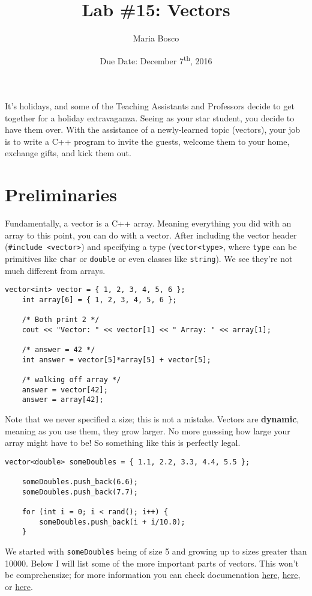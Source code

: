 \documentclass[12pt]{article}
\title{Lab \#15: Vectors}
\date{Due Date: December 7\textsuperscript{th}, 2016}
\author{Maria Bosco}
\newcommand{\shellcmd}[1]{\texttt{\colorbox{gray!30}{#1}}}
\begin{document}
\maketitle

It's holidays, and some of the Teaching Assistants and Professors decide to get together for a holiday extravaganza. Seeing as your star student, you decide to have them over. With the assistance of a newly-learned topic (vectors), your job is to write a C++ program to invite the guests, welcome them to your home, exchange gifts, and kick them out.

\section{Preliminaries}
Fundamentally, a vector is a C++ array. Meaning everything you did with an array to this point, you can do with a vector. After including the vector header (\shellcmd{\#include <vector>}) and specifying a type (\shellcmd{vector<type>}, where \texttt{type} can be primitives like \shellcmd{char} or \shellcmd{double} or even classes like \shellcmd{string}). We see they're not much different from arrays.

\begin{lstlisting}[style=cC++]
    vector<int> vector = { 1, 2, 3, 4, 5, 6 };
	int array[6] = { 1, 2, 3, 4, 5, 6 };

	/* Both print 2 */
	cout << "Vector: " << vector[1] << " Array: " << array[1];

	/* answer = 42 */
	int answer = vector[5]*array[5] + vector[5];

	/* walking off array */
	answer = vector[42];
	answer = array[42];
\end{lstlisting}

Note that we never specified a size; this is not a mistake. Vectors are \textbf{dynamic}, meaning as you use them, they grow larger. No more guessing how large your array might have to be! So something like this is perfectly legal.

\begin{lstlisting}[style=cC++]
    vector<double> someDoubles = { 1.1, 2.2, 3.3, 4.4, 5.5 };

	someDoubles.push_back(6.6);
	someDoubles.push_back(7.7);

	for (int i = 0; i < rand(); i++) {
		someDoubles.push_back(i + i/10.0);
	}
\end{lstlisting}

We started with \shellcmd{someDoubles} being of size \num{5} and growing up to sizes greater than \num{10000}. Below I will list some of the more important parts of vectors. This won't be comprehensize; for more information you can check documenation
\href{http://www.cplusplus.com/reference/vector/vector/}{here},
\href{http://en.cppreference.com/w/cpp/container/vector}{here}, or
\href{https://www.tutorialspoint.com/cplusplus/cpp_stl_tutorial.htm}{here}.
\end{document}
